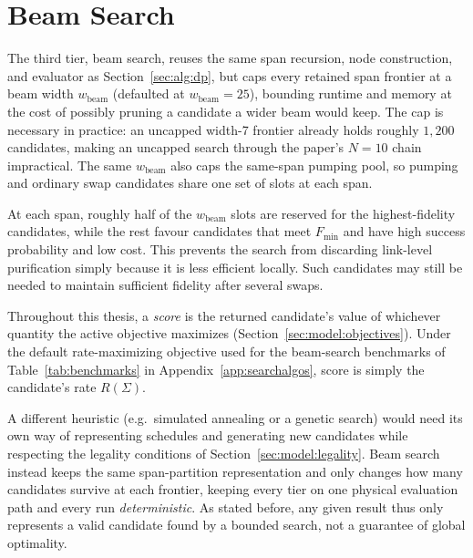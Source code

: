 \vspace{0.6cm}

\section{Beam Search}
\label{sec:alg:beam}

The third tier, beam search, reuses the same span recursion, node construction, and evaluator as Section~\ref{sec:alg:dp}, but caps every retained span frontier at a beam width $w_{\text{beam}}$ (defaulted at $w_{\text{beam}}=25$), bounding runtime and memory at the cost of possibly pruning a candidate a wider beam would keep. The cap is necessary in practice: an uncapped width-7 frontier already holds roughly $1{,}200$ candidates, making an uncapped search through the paper's $N=10$ chain impractical. The same $w_{\text{beam}}$ also caps the same-span pumping pool, so pumping and ordinary swap candidates share one set of slots at each span.

At each span, roughly half of the $w_{\text{beam}}$ slots are reserved for the highest-fidelity candidates, while the rest favour candidates that meet $F_{\min}$ and have high success probability and low cost. This prevents the search from discarding link-level purification simply because it is less efficient locally. Such candidates may still be needed to maintain sufficient fidelity after several swaps.

Throughout this thesis, a \emph{score} is the returned candidate's value of whichever quantity the active objective maximizes (Section~\ref{sec:model:objectives}). Under the default rate-maximizing objective used for the beam-search benchmarks of Table~\ref{tab:benchmarks} in Appendix~\ref{app:searchalgos}, score is simply the candidate's rate $R(\Sigma)$.

A different heuristic (e.g.\ simulated annealing or a genetic search) would need its own way of representing schedules and generating new candidates while respecting the legality conditions of Section~\ref{sec:model:legality}. Beam search instead keeps the same span-partition representation and only changes how many candidates survive at each frontier, keeping every tier on one physical evaluation path and every run \emph{deterministic}. As stated before, any given result thus only represents a valid candidate found by a bounded search, not a guarantee of global optimality.
